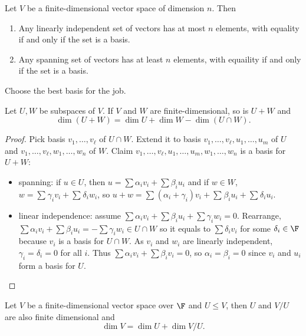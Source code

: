 \documentclass[a4paper]{article}
\theoremstyle{definition}
\begin{document}
\begin{corollary}
  Let \(V\) be a finite-dimensional vector space of dimension \(n\). Then
  \begin{enumerate}
  \item Any linearly independent set of vectors has at most \(n\) elements, with equality if and only if the set is a basis.
  \item Any spanning set of vectors has at least \(n\) elements, with equaility if and only if the set is a basis.
  \end{enumerate}
\end{corollary}

\begin{slogan}
  Choose the best basis for the job.
\end{slogan}

\begin{theorem}
  Let \(U, W\) be subspaces of \(V\). If \(V\) and \(W\) are finite-dimensional, so is \(U+W\) and
  \[
\dim(U+W) = \dim U + \dim W - \dim(U\cap W).
  \]
\end{theorem}

\begin{proof}
  Pick basis \(v_1,\ldots, v_\ell\) of \(U\cap W\). Extend it to basis \(v_1,\ldots,v_\ell,u_1,\ldots,u_m\) of \(U\) and \(v_1,\ldots,v_\ell,w_1,\ldots,w_n\) of \(W\). Claim \(v_1,\ldots, v_\ell,u_1,\ldots,u_m,w_1,\ldots,w_n\) is a basis for \(U+W\):
  \begin{itemize}
  \item spanning: if \(u\in U\), then \(u= \sum \alpha_iv_i + \sum \beta_iu_i\) and if \(w\in W\), \(w = \sum_{}^{}\gamma_iv_i + \sum_{}^{}\delta_iw_i\), so \(u+w = \sum_{}^{}(\alpha_i + \gamma_i)v_i + \sum_{}^{}\beta_iu_i + \sum_{}^{}\delta_iu_i\).
  \item linear independence: assume \(\sum \alpha_iv_i + \sum \beta_iu_i+ \sum \gamma_iw_i=0\). Rearrange, \(\sum\alpha_iv_i + \sum\beta_iu_i = -\sum\gamma_iw_i \in U\cap W\) so it equals to \(\sum\delta_iv_i\) for some \(\delta_i\in \F\) because \(v_i\) is a basis for \(U\cap W\). As \(v_i\) and \(w_i\) are linearly independent, \(\gamma_i=\delta_i=0\) for all \(i\). Thus \(\sum\alpha_iv_i + \sum\beta_iv_i=0\), so \(\alpha_i=\beta_i=0\) since \(v_i\) and \(u_i\) form a basis for \(U\).
  \end{itemize}
\end{proof}

\begin{theorem}
  Let \(V\) be a finite-dimensional vector space over \(\F\) and \(U \leq V\), then \(U\) and \(V/U\) are also finite dimensional and
  \[
\dim V = \dim U + \dim V/U.
  \]
\end{theorem}
\end{document}
